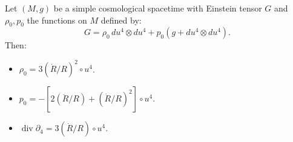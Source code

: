 Let $(M, g)$ be a simple cosmological spacetime with Einstein tensor $G$ and $\rho_0, p_0$ the functions on $M$ defined by:
$$G = \rho_0 \, du^4 \otimes du^4 + p_0\left(g + du^4 \otimes du^4\right).$$
Then:
\begin{itemize}
\item[(a)] $\rho_0 = 3(\dot{R}/R)^2 \circ u^4$.
\item[(b)] $p_0 = -[2(\ddot{R}/R) + (\dot{R}/R)^2] \circ u^4$.
\item[(c)] $\operatorname{div} \partial_4 = 3(\dot{R}/R) \circ u^4$.
\end{itemize}
